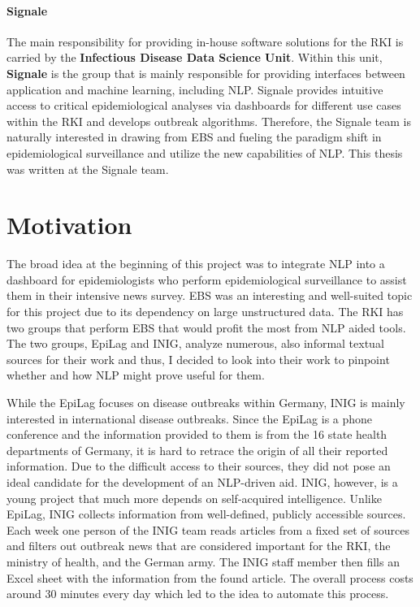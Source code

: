 \paragraph{Signale}
  The main responsibility for providing in-house software solutions for the RKI is carried by the \textbf{Infectious Disease Data Science Unit}.
  Within this unit, \textbf{Signale} is the group that is mainly responsible for providing interfaces between application and machine learning, including NLP.
  Signale provides intuitive access to critical epidemiological analyses via dashboards for different use cases within the RKI and develops outbreak algorithms.
  Therefore, the Signale team is naturally interested in drawing from EBS and fueling the paradigm shift in epidemiological surveillance and utilize the new capabilities of NLP.
  This thesis was written at the Signale team.

\section{Motivation}
  The broad idea at the beginning of this project was to integrate NLP into a dashboard for epidemiologists who perform epidemiological surveillance to assist them in their intensive news survey.
  EBS was an interesting and well-suited topic for this project due to its dependency on large unstructured data.
  The RKI has two groups that perform EBS that would profit the most from NLP aided tools. The two groups, EpiLag and INIG, analyze numerous, also informal textual sources for their work and thus, I decided to look into their work to pinpoint whether and how NLP might prove useful for them.

  While the EpiLag focuses on disease outbreaks within Germany, INIG is mainly interested in international disease outbreaks. Since the EpiLag is a phone conference and the information provided to them is from the 16 state health departments of Germany, it is hard to retrace the origin of all their reported information.
  Due to the difficult access to their sources, they did not pose an ideal candidate for the development of an NLP-driven aid.
  INIG, however, is a young project that much more depends on self-acquired intelligence.
  Unlike EpiLag, INIG collects information from well-defined, publicly accessible sources.
  Each week one person of the INIG team reads articles from a fixed set of sources and filters out outbreak news that are considered important for the RKI, the ministry of health, and the German army.
  The INIG staff member then fills an Excel sheet with the information from the found article.
  The overall process costs around 30 minutes every day which led to the idea to automate this process.

